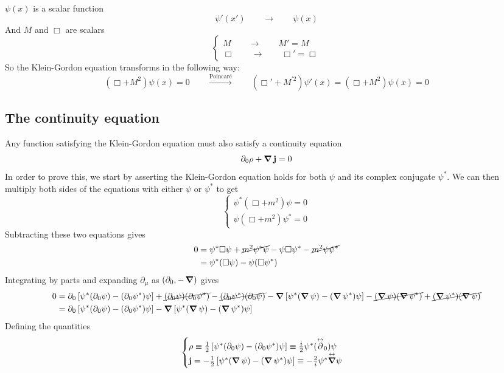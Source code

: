 $\psi(x)$ is a scalar function
 \[ \psi'(x') \qquad \to \qquad \psi(x) \]
 And $M$ and $\Box$ are scalars
 \[ \begin{cases}
 M \qquad \to \qquad M'=M \\
 \Box \qquad \to \qquad \Box' = \Box
 \end{cases} \]
 So the Klein-Gordon equation transforms in the following way:
 \[\left(\Box + M^2\right)\psi(x) = 0 \qquad \overset{\text{Poincaré}}{\to} \qquad \left(\Box' + M^{\prime2}\right)\psi'(x) = \left(\Box + M^2\right)\psi(x) = 0\]
\subsection{The continuity equation}
Any function satisfying the Klein-Gordon equation must also satisfy a continuity equation
\[ \partial_0\rho + \operatorname{\bm{\mathrm{\nabla}}}\bm{\mathrm{j}}=0 \]
In order to prove this, we start by asserting the Klein-Gordon equation holds for both $\psi$ and its complex conjugate $\psi^*$. We can then multiply both sides of the equations with either $\psi$ or $\psi^*$ to get
\[ \begin{cases}
\psi^*\left(\Box + m^2\right)\psi = 0 \\ \psi \left(\Box + m^2\right)\psi^* = 0
\end{cases} \]
Subtracting these two equations gives
\begin{align*}
 0 &= \psi^*\Box\psi + \cancel{m^2\psi^*\psi} - \psi\Box\psi^* - \cancel{m^2\psi\psi^*} \\
&= \psi^*(\Box\psi) - \psi(\Box\psi^*)
\end{align*}
Integrating by parts and expanding $\partial_\mu$ as $(\partial_0, -\operatorname{\bm{\mathrm{\nabla}}})$ gives
\begin{align*}
0 &= \partial_0 \left[\psi^*(\partial_0\psi)- (\partial_0\psi^*)\psi\right] + \cancel{(\partial_0\psi)(\partial_0\psi^*)} - \cancel{(\partial_0\psi^*)(\partial_0\psi)} - \operatorname{\bm{\mathrm{\nabla}}}\left[\psi^*(\operatorname{\bm{\mathrm{\nabla}}}\psi) - (\operatorname{\bm{\mathrm{\nabla}}}\psi^*)\psi\right] -\cancel{(\operatorname{\bm{\mathrm{\nabla}}}\psi)(\operatorname{\bm{\mathrm{\nabla}}}\psi^*)} + \cancel{(\operatorname{\bm{\mathrm{\nabla}}}\psi^*)(\operatorname{\bm{\mathrm{\nabla}}}\psi)} \\
&= \partial_0 \left[\psi^*(\partial_0\psi)- (\partial_0\psi^*)\psi\right]  - \operatorname{\bm{\mathrm{\nabla}}}\left[\psi^*(\operatorname{\bm{\mathrm{\nabla}}}\psi) - (\operatorname{\bm{\mathrm{\nabla}}}\psi^*)\psi\right]
\end{align*}
Defining the quantities
\[\begin{cases}
\rho \equiv \frac{1}{2}\left[\psi^*(\partial_0\psi)-(\partial_0\psi^*)\psi\right] \equiv \frac{i}{2}\psi^*(\overset{\leftrightarrow}{\partial}_0)\psi \\
\bm{\mathrm{j}} = - \frac{1}{2}\left[\psi^*(\operatorname{\bm{\mathrm{\nabla}}}\psi)-(\operatorname{\bm{\mathrm{\nabla}}}\psi^*)\psi\right] \equiv - \frac{2}{i}\psi^*\overset{\leftrightarrow}{\operatorname{\bm{\mathrm{\nabla}}}}\psi
\end{cases}\]
